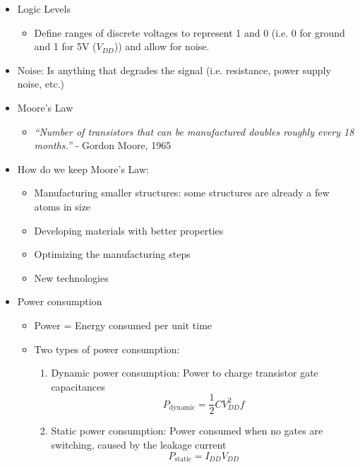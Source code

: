 \documentclass[a4paper]{article}
\begin{document}
\begin{itemize}
\item Logic Levels
\begin{itemize}
\item Define ranges of discrete voltages to represent 1 and 0 (i.e. 0 for ground and 1 for 5V ($V_{DD}$)) and allow for noise.
\end{itemize}
\item Noise: Is anything that degrades the signal (i.e. resistance, power supply noise, etc.)
\item Moore's Law
\begin{itemize}
\item \emph{``Number of transistors that can be manufactured doubles roughly every 18 months.''} - Gordon Moore, 1965
\end{itemize}
\item How do we keep Moore's Law:
\begin{itemize}
\item Manufacturing smaller structures: some structures are already a few atoms in size
\item Developing materials with better properties
\item Optimizing the manufacturing steps
\item New technologies
\end{itemize}
\item Power consumption
\begin{itemize}
\item Power = Energy consumed per unit time
\item Two types of power consumption:
\begin{enumerate}
\item Dynamic power consumption: Power to charge transistor gate capacitances \[P_{\text{dynamic}}=\frac{1}{2}CV_{DD}^2f\]
\item Static power consumption: Power consumed when no gates are switching, caused by the leakage current \[P_{\text{static}}=I_{DD}V_{DD}\]
\end{enumerate}
\end{itemize}
\end{itemize}
\end{document}
